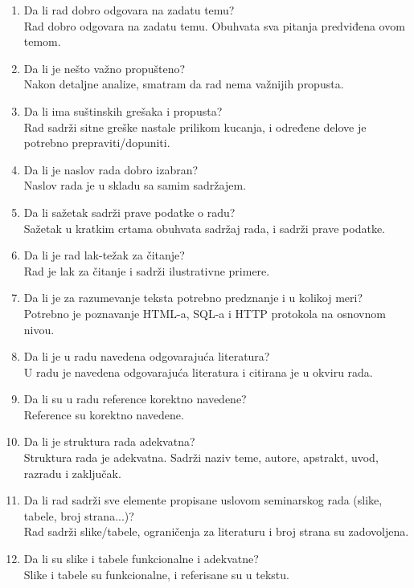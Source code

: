 \documentclass[a4paper]{article}
\begin{document}
\begin{enumerate}
\item Da li rad dobro odgovara na zadatu temu?\\
	Rad dobro odgovara na zadatu temu. Obuhvata sva pitanja predviđena ovom temom.
\item Da li je nešto važno propušteno?\\
	Nakon detaljne analize, smatram da rad nema važnijih propusta.
\item Da li ima suštinskih grešaka i propusta?\\
	Rad sadrži sitne greške nastale prilikom kucanja, i određene delove je potrebno prepraviti/dopuniti.
\item Da li je naslov rada dobro izabran?\\
	Naslov rada je u skladu sa samim sadržajem.
\item Da li sažetak sadrži prave podatke o radu?\\
	Sažetak u kratkim crtama obuhvata sadržaj rada, i sadrži prave podatke.
\item Da li je rad lak-težak za čitanje?\\
	Rad je lak za čitanje i sadrži ilustrativne primere.
\item Da li je za razumevanje teksta potrebno predznanje i u kolikoj meri?\\
	Potrebno je poznavanje HTML-a, SQL-a i HTTP protokola na osnovnom nivou.
\item Da li je u radu navedena odgovarajuća literatura?\\
	U radu je navedena odgovarajuća literatura i citirana je u okviru rada.
\item Da li su u radu reference korektno navedene?\\
	Reference su korektno navedene.
\item Da li je struktura rada adekvatna?\\
	Struktura rada je adekvatna. Sadrži naziv teme, autore, apstrakt, uvod, razradu i zaključak.
\item Da li rad sadrži sve elemente propisane uslovom seminarskog rada (slike, tabele, broj strana...)?\\
	Rad sadrži slike/tabele, ograničenja za literaturu i broj strana su zadovoljena.
\item Da li su slike i tabele funkcionalne i adekvatne?\\
	Slike i tabele su funkcionalne, i referisane su u tekstu.
\end{enumerate}
\end{document}
